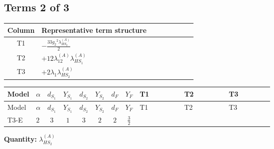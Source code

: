 \documentclass[8pt]{article}
\begin{document}
\begin{landscape}
\subsection*{Terms 2 of 3}
\begin{center}
\begin{tabular}{@{}c >{\raggedright\arraybackslash}p{0.82\linewidth}@{}}
\toprule
Column & Representative term structure \\
\midrule
T1 & \(\displaystyle -\frac{33 {g_2}^2 {\lambda_{HS_2}^{(A)}}}{2}\) \\
\midrule
T2 & \(\displaystyle +12 {\lambda_{12}^{(A)}} {\lambda_{HS_1}^{(A)}}\) \\
\midrule
T3 & \(\displaystyle +2 {\lambda_1} {\lambda_{HS_2}^{(A)}}\) \\
\midrule
\bottomrule
\end{tabular}
\end{center}
\smallskip
\tiny
\begin{longtable}{@{}llcccccc >{\raggedright\arraybackslash}p{0.21\linewidth} >{\raggedright\arraybackslash}p{0.21\linewidth} >{\raggedright\arraybackslash}p{0.21\linewidth}@{}}
\toprule
Model & $\alpha$ & $d_{S_1}$ & $Y_{S_1}$ & $d_{S_2}$ & $Y_{S_2}$ & $d_F$ & $Y_F$ & T1 & T2 & T3 \\
\midrule
\endfirsthead
\toprule
Model & $\alpha$ & $d_{S_1}$ & $Y_{S_1}$ & $d_{S_2}$ & $Y_{S_2}$ & $d_F$ & $Y_F$ & T1 & T2 & T3 \\
\midrule
\endhead
T3-E & $2$ & $3$ & $1$ & $3$ & $2$ & $2$ & $\frac{3}{2}$ & \scriptsize\adjustbox{max width=\linewidth}{$\begin{gathered} -\frac{33 {g_2}^2 {\lambda_{HS_2}^{(A)}}}{2}\end{gathered}$} & \scriptsize\adjustbox{max width=\linewidth}{$\begin{gathered} +12 {\lambda_{12}^{(A)}} {\lambda_{HS_1}^{(A)}}\end{gathered}$} & \scriptsize\adjustbox{max width=\linewidth}{$\begin{gathered} +2 {\lambda_1} {\lambda_{HS_2}^{(A)}}\end{gathered}$} \\
\midrule
\bottomrule
\end{longtable}
\clearpage
\noindent\textbf{Quantity: }$\lambda_{HS_2}^{(A)}$\par\smallskip

\end{landscape}
\end{document}
